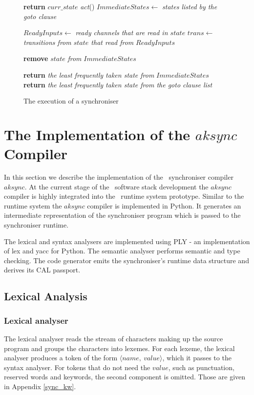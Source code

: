 \begin{figure}[h!]
{\begin{minipage}{\dimexpr\linewidth-2\fboxsep-2\fboxrule\relax}
\begin{algorithmic}[1]
    \State \textbf{return} $curr\_state$
  \EndIf
  \State \emph{act}()
  \State $ImmediateStates\gets$ \emph{states listed by the goto clause}
  \Statex

    \State $ReadyInputs\gets$ \emph{ready channels that are read in $state$}
    \State $trans\gets$ \emph{transitions from $state$ that read from} $ReadyInputs$

      \State \textbf{remove} $state$ \emph{from} $ImmediateStates$
    \EndIf
  \EndFor

    \State \textbf{return} \emph{the least frequently taken state from} $ImmediateStates$    
  \EndIf
  \State \textbf{return} \emph{the least frequently taken state from the goto clause list}
\EndFunction
\end{algorithmic}
\end{minipage}%
}
\caption{The execution of a synchroniser\label{fig:execod_alg}}
\end{figure}




\section{The Implementation of the $aksync$ Compiler}
In this section we describe the implementation of the \ak\ synchroniser compiler $aksync$. At the current stage of the \ak\ software stack development the $aksync$ compiler is highly integrated into the \ak\ runtime system prototype. Similar to the runtime system the $aksync$ compiler is implemented in Python. It generates an intermediate representation of the synchroniser program which is passed to the synchroniser runtime.

The lexical and syntax analysers are implemented using PLY \cite{ply} - an implementation of lex and yacc for Python. The semantic analyser performs semantic and type checking. The code generator emits the synchroniser's runtime data structure and derives its CAL passport.


\subsection{Lexical Analysis}
  \subsubsection{Lexical analyser}
The lexical analyser reads the stream of characters making up the source program and groups the characters into lexemes. For each lexeme, the lexical analyser produces a token of the form $\langle name, \: value \rangle$, which it passes to the syntax analyser. For tokens that do not need the $value$, such as punctuation, reserved words and keywords, the second component is omitted. Those are given in Appendix \ref{sync_kw}.


